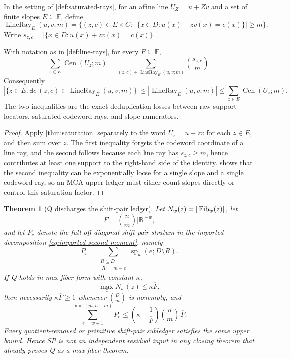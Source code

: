 \documentclass[11pt,a4paper]{amsart}
\numberwithin{equation}{section}
\newtheorem{theorem}{Theorem}[section]
\theoremstyle{remark}
\DeclareMathOperator{\Cen}{Cen}\DeclareMathOperator{\LineRay}{LineRay}\DeclareMathOperator{\dist}{dist}
\newcommand{\F}{\mathbb F}\newcommand{\B}{\mathbb B}\newcommand{\K}{\mathbb K}\newcommand{\Z}{\mathbb Z}
\begin{document}
\begin{definition}\label{def:line-rays}
In the setting of \cref{def:saturated-rays}, for an affine line \(U_Z=u+Zv\) and a set of finite slopes \(E\subseteq\F\), define
\[
        \LineRay_E(u,v;m)
        =
        \{(z,c)\in E\times C:\ |\{x\in D:u(x)+zv(x)=c(x)\}|\ge m\}.
\]
Write \(s_{z,c}=|\{x\in D:u(x)+zv(x)=c(x)\}|\).
\end{definition}

\begin{proposition}\label{prop:line-ray-saturation}
With notation as in \cref{def:line-rays}, for every \(E\subseteq\F\),
\[
        \sum_{z\in E}\Cen(U_z;m)
        =
        \sum_{(z,c)\in\LineRay_E(u,v;m)}\binom{s_{z,c}}m .
\]
Consequently
\[
        |\{z\in E:\exists c\ (z,c)\in\LineRay_E(u,v;m)\}|
        \le
        |\LineRay_E(u,v;m)|
        \le
        \sum_{z\in E}\Cen(U_z;m).
\]
The two inequalities are the exact deduplication losses between raw support locators, saturated codeword rays, and slope numerators.
\end{proposition}

\begin{proof}
Apply \cref{thm:saturation} separately to the word \(U_z=u+zv\) for each \(z\in E\), and then sum over \(z\).  The first inequality forgets the codeword coordinate of a line ray, and the second follows because each line ray has \(s_{z,c}\ge m\), hence contributes at least one support to the right-hand side of the identity.   shows that the second inequality can be exponentially loose for a single slope and a single codeword ray, so an MCA upper ledger must either count slopes directly or control this saturation factor.
\end{proof}

\begin{theorem}[Q discharges the shift-pair ledger]\label{thm:q-implies-sp}
Let \(N_w(z)=|\operatorname{Fib}_w(z)|\), let
\[
        \overline F=\binom nm |\B|^{-w},
\]
and let \(P_e\) denote the full off-diagonal shift-pair stratum in the imported decomposition \eqref{eq:imported-second-moment}, namely
\[
        P_e=\sum_{\substack{R\subseteq D\\ |R|=m-e}}\operatorname{sp}_w(e;D\setminus R).
\]
If Q holds in max-fiber form with constant \(\kappa\),
\[
        \max_z N_w(z)\le \kappa\overline F,
\]
then necessarily \(\kappa\overline F\ge1\) whenever \(\binom Dm\) is nonempty, and
\[
        \sum_{e=w+1}^{\min(m,n-m)}P_e
        \le
        \left(\kappa-\frac{1}{\overline F}\right)\binom nm\,\overline F .
\]
Every quotient-removed or primitive shift-pair subledger satisfies the same upper bound.  Hence SP is not an independent residual input in any closing theorem that already proves Q as a max-fiber theorem.
\end{theorem}
\end{document}
